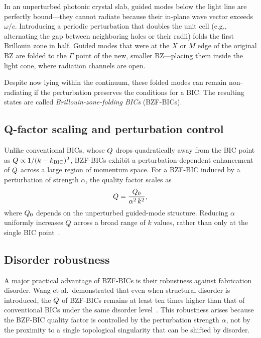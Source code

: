 In an unperturbed photonic crystal slab, guided modes below the light
line are perfectly bound---they cannot radiate because their in-plane
wave vector exceeds $\omega/c$. Introducing a periodic perturbation
that doubles the unit cell (e.g., alternating the gap between
neighboring holes or their radii) folds the first Brillouin zone in
half. Guided modes that were at the $X$ or $M$ edge of the original
BZ are folded to the $\Gamma$ point of the new, smaller BZ---placing
them inside the light cone, where radiation channels are open.

Despite now lying within the continuum, these folded modes can remain
non-radiating if the perturbation preserves the conditions for a BIC.
The resulting states are called \emph{Brillouin-zone-folding BICs}
(BZF-BICs).

\subsection{Q-factor scaling and perturbation control}
\label{ssec:bzf-q-scaling}

Unlike conventional BICs, whose $Q$ drops quadratically away from
the BIC point as $Q \propto 1/(k - k_{\mathrm{BIC}})^2$, BZF-BICs
exhibit a perturbation-dependent enhancement of $Q$ across a large
region of momentum space. For a BZF-BIC induced by a perturbation of
strength $\alpha$, the quality factor scales as
\begin{equation}
 Q = \frac{Q_0}{\alpha^2\,k^2},
 \label{eq:bzf-q-scaling}
\end{equation}
where $Q_0$ depends on the unperturbed guided-mode structure.
Reducing $\alpha$ uniformly increases $Q$ across a broad range of
$k$ values, rather than only at the single BIC
point~\cite{wang2023brillouin}.

\subsection{Disorder robustness}
\label{ssec:bzf-disorder}

A major practical advantage of BZF-BICs is their robustness against
fabrication disorder. Wang et al.\ demonstrated that even when
structural disorder is introduced, the $Q$ of BZF-BICs remains at
least ten times higher than that of conventional BICs under the same
disorder level~\cite{wang2023brillouin}. This robustness arises because
the BZF-BIC quality factor is controlled by the perturbation strength
$\alpha$, not by the proximity to a single topological singularity that
can be shifted by disorder.



